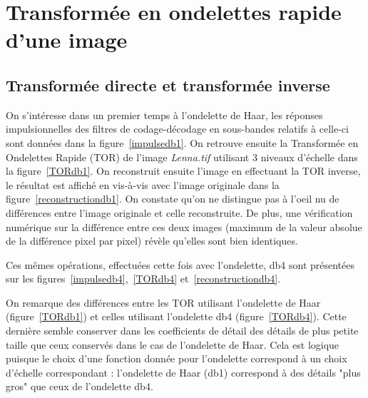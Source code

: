 \documentclass[12pt]{article}
\begin{document}
\section{Transformée en ondelettes rapide d'une image}
\subsection{Transformée directe et transformée inverse}

On s'intéresse dans un premier temps à l'ondelette de Haar, les réponses impulsionnelles
des filtres de codage-décodage en sous-bandes relatifs à celle-ci sont données dans la
figure~\ref{impulsedb1}. On retrouve ensuite la Transformée en Ondelettes Rapide (TOR)
de l'image \textit{Lenna.tif} utilisant 3 niveaux d'échelle dans la figure~\ref{TORdb1}.
On reconstruit ensuite l'image en effectuant la TOR inverse, le résultat est affiché en
vis-à-vis avec l'image originale dans la figure~\ref{reconstructiondb1}. On constate
qu'on ne distingue pas à l'oeil nu de différences entre l'image originale et celle
reconstruite. De plus, une vérification numérique sur la différence entre ces deux
images (maximum de la valeur absolue de la différence pixel par pixel) révèle qu'elles
sont bien identiques.

Ces mêmes opérations, effectuées cette fois avec l'ondelette, db4 sont présentées sur
les figures~\ref{impulsedb4},~\ref{TORdb4} et~\ref{reconstructiondb4}.

On remarque des différences entre les TOR utilisant l'ondelette de Haar
(figure~\ref{TORdb1}) et celles utilisant l'ondelette db4 (figure~\ref{TORdb4}). Cette
dernière semble conserver dans les coefficients de détail des détails de plus petite
taille que ceux conservés dans le cas de l'ondelette de Haar. Cela est logique puisque
le choix d'une fonction donnée pour l'ondelette correspond à un choix d'échelle
correspondant : l'ondelette de Haar (db1) correspond à des détails "plus gros" que ceux
de l'ondelette db4.
\end{document}
